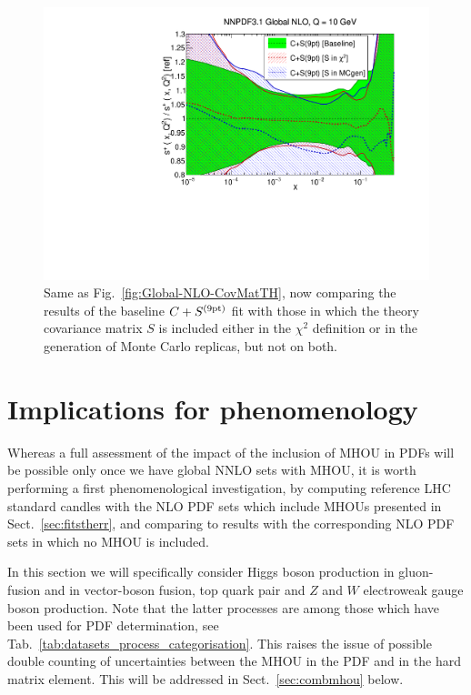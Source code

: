 \begin{figure}[h]
\begin{center}
   \includegraphics[scale=0.39]{mhous/plots/xsp-Global-NLO-CovMatTH-tests.pdf}
   \caption{\small Same as Fig.~\ref{fig:Global-NLO-CovMatTH}, now comparing
     the results of the baseline $C+S^{(\rm 9pt)}$ fit with those in which
     the theory covariance matrix $S$ is included either in the $\chi^2$
     definition or in the generation of Monte Carlo replicas, but not on both.
    \label{fig:Global-NLO-CovMatTH-tests} }
  \end{center}
\end{figure}

\section{Implications for phenomenology}
\label{sec:pheno}

Whereas a  full assessment of the impact of the inclusion of MHOU in
PDFs will be possible only once we have global NNLO sets with MHOU, 
it is worth performing a first phenomenological
investigation, by computing reference LHC standard candles with the
NLO PDF sets which include MHOUs presented in Sect.~\ref{sec:fitstherr}, 
and comparing to results with the corresponding NLO PDF sets in which 
no MHOU is included.

In this section we will specifically consider
Higgs boson production in gluon-fusion and in vector-boson fusion, 
top quark pair and $Z$ and $W$ electroweak gauge boson
production. Note that the latter processes are among those which have
been used for PDF determination, see
Tab.~\ref{tab:datasets_process_categorisation}. This raises the issue
of possible double counting of uncertainties between the MHOU in the
PDF and in the hard matrix element. This will be addressed in
Sect.~\ref{sec:combmhou} below.

